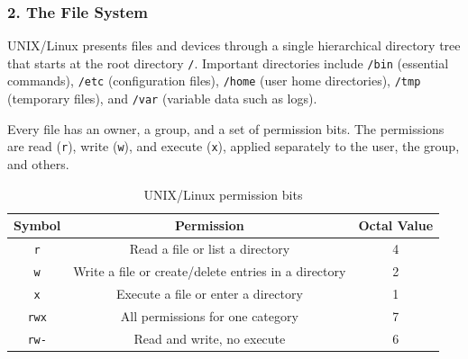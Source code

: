\subsubsection*{2. The File System}
UNIX/Linux presents files and devices through a single hierarchical directory tree that starts at the root directory \texttt{/}. Important directories include \texttt{/bin} (essential commands), \texttt{/etc} (configuration files), \texttt{/home} (user home directories), \texttt{/tmp} (temporary files), and \texttt{/var} (variable data such as logs).

Every file has an owner, a group, and a set of permission bits. The permissions are read (\texttt{r}), write (\texttt{w}), and execute (\texttt{x}), applied separately to the user, the group, and others.

\begin{table}[H]
\centering
\small
\renewcommand{\arraystretch}{1.2}
\begin{tabular}{|c|c|c|}
\hline
\textbf{Symbol} & \textbf{Permission} & \textbf{Octal Value} \\ \hline
\texttt{r} & Read a file or list a directory & 4 \\ \hline
\texttt{w} & Write a file or create/delete entries in a directory & 2 \\ \hline
\texttt{x} & Execute a file or enter a directory & 1 \\ \hline
\texttt{rwx} & All permissions for one category & 7 \\ \hline
\texttt{rw-} & Read and write, no execute & 6 \\ \hline
\end{tabular}
\caption{UNIX/Linux permission bits}
\end{table}

